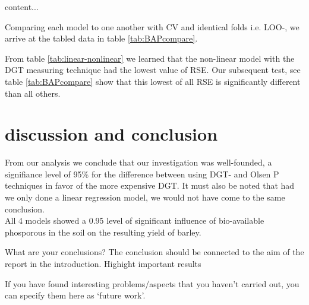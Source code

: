 \documentclass{article}
\begin{document}
\begin{table}
	content...
\end{table}


Comparing each model to one another with CV and identical folds i.e. LOO-, we arrive at the tabled data in table \ref{tab:BAPcompare}.

From table \ref{tab:linear-nonlinear} we learned that the non-linear model with the DGT measuring technique had the lowest value of RSE. Our subsequent test, see table \ref{tab:BAPcompare} show that this lowest of all RSE is significantly different than all others.



\section{discussion and conclusion}

From our analysis we conclude that our investigation was well-founded, a signifiance level of 95\% for the difference between using DGT- and Olsen P techniques in favor of the more expensive DGT. It  must also be noted that had we only done a linear regression model, we would not have come to the same conclusion. \\ All 4 models showed a 0.95 level of significant influence of bio-available phosporous in the soil on the resulting yield of barley.

What are your conclusions? The conclusion should be connected to the aim of the report in the introduction.
	Highight important results
	
If you have found interesting problems/aspects that you haven’t carried out, you can specify them here as ‘future work’.
\end{document}
